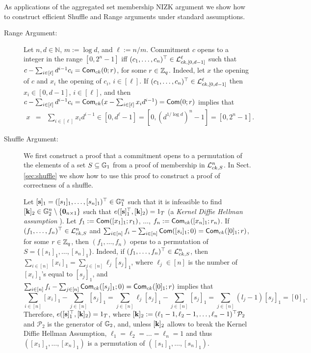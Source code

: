 As applications of the aggregated set membership NIZK argument we show how to construct efficient Shuffle and Range arguments under standard assumptions.

\begin{description}
\item[Range Argument:]
Let $n,d\in\mathbb{N}$, $m:=\log d$, and $\ell:=n/m$.
Commitment $c$ opens to a integer in the range $[0,2^n-1]$ iff $(c_1,\ldots,c_n)^\top\in\mathcal{L}_{ck,[0,d-1]}^\ell$ such that $c-\sum_{i\in[\ell]}d^{i-1}c_i=\mathsf{Com}_{ck}(0;r)$, for some $r\in\mathbb{Z}_q$. Indeed, let $x$ the opening of $c$ and $x_i$ the opening of $c_i$, $i\in[\ell]$. If $(c_1,\ldots,c_n)^\top\in\mathcal{L}_{ck,[0,d-1]}^\ell$ then $x_i\in[0,d-1]$, $i\in[\ell]$, and then $c-\sum_{i\in[\ell]}d^{i-1}c_i=\mathsf{Com}_{ck}(x-\sum_{i\in[\ell]}x_id^{i-1})=\mathsf{Com}(0;r)$ implies that
\begin{eqnarray*}
x & = & \sum_{i\in[\ell]} x_id^{i-1}
   \in  [0,d^\ell-1]  =  [0,(d^{1/\log d})^n-1] = [0,2^n-1].
\end{eqnarray*}

\item[Shuffle Argument:] We first construct a proof that a commitment opens to a permutation of the elements of a set $S\subseteq\mathbb{G}_1$ from a proof of membership in $\mathcal{L}_{ck,S}^n$. In Sect. \ref{sec:shuffle} we show how to use this proof to construct a proof of correctness of a shuffle.

Let $[\mathbf{s}]_1=([s_1]_1,\ldots,[s_n]_1)^\top\in\mathbb{G}_1^n$ such that it is infeasible to find $[\mathbf{k}]_2\in\mathbb{G}_2^n\setminus\{\mathbf{0}_{n\times 1}\}$ such that $e([\mathbf{{s}}]_1^\top,[\mathbf{k}]_2)=1_T$ (a \emph{Kernel Diffie Hellman assumption} \cite{EPRINT:MorRafVil15}). Let $f_1:=\mathsf{Com}([x_1]_1;r_1)$, $\ldots$, $f_n:=\mathsf{Com}_{ck}([x_n]_1;r_n)$. If $(f_1,\ldots,f_n)^\top\in\mathcal{L}_{ck,S}^n$ and $\sum_{i\in[n]}f_i-\sum_{i\in[n]}\mathsf{Com}([s_i]_1;0)=\mathsf{Com}_{ck}([0]_1;r)$, for some $r\in\mathbb{Z}_q$, then $(f_1,\ldots,f_n)$ opens to a permutation of $S=\{[s_1]_1,\ldots,[s_n]_1\}$.
Indeed, if $(f_1,\ldots,f_n)^\top\in\mathcal{L}_{ck,S}^n$, then $\sum_{i\in[n]}[x_i]_1=\sum_{j\in[n]}\ell_j[s_j]_1$, where $\ell_j\in[n]$ is the number of $[x_i]_1$'s equal to $[s_j]_1$, and $\sum_{i\in[n]}f_i-\sum_{j\in[n]}\mathsf{Com}_{ck}([s_j]_1;0)=\mathsf{Com}_{ck}([0]_1;r)$ implies that
$$
\sum_{i\in[n]}[x_i]_1 - \sum_{j\in[n]}[s_j]_1 = \sum_{j\in[n]}\ell_j[s_j]_1 - \sum_{j\in[n]}[s_j]_1 = \sum_{j\in[n]} (l_j-1)[s_j]_1 = [0]_1.
$$
Therefore, $e([\mathbf{{s}}]_1^\top,[\mathbf{k}]_2)=1_T$, where $[\mathbf{k}]_2:=(\ell_1-1,\ell_2-1,\ldots,\ell_n-1)^\top\mathcal{P}_2$ and $\mathcal{P}_2$ is the generator of $\mathbb{G}_2$, and, unless $[\mathbf{k}]_2$ allows to break the Kernel Diffie Hellman Assumption, $\ell_1=\ell_2=\ldots=\ell_n=1$ and thus $([x_1]_1,\ldots,[x_n]_1)$ is a permutation of $([s_1]_1,\ldots,[s_n]_1)$.
\end{description}
